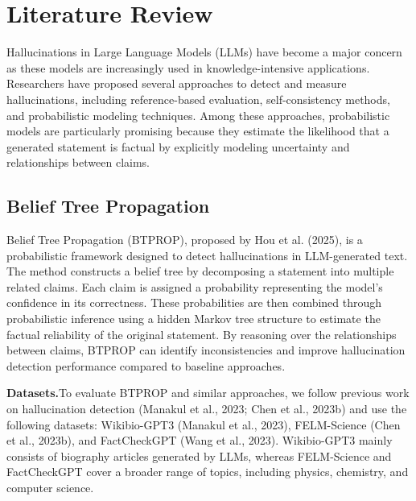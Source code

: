 \section{Literature Review}

Hallucinations in Large Language Models (LLMs) have become a major concern as these models are increasingly used in knowledge-intensive applications. Researchers have proposed several approaches to detect and measure hallucinations, including reference-based evaluation, self-consistency methods, and probabilistic modeling techniques. Among these approaches, probabilistic models are particularly promising because they estimate the likelihood that a generated statement is factual by explicitly modeling uncertainty and relationships between claims.

\subsection{Belief Tree Propagation}

Belief Tree Propagation (BTPROP), proposed by Hou et al. (2025), is a probabilistic framework designed to detect hallucinations in LLM-generated text. The method constructs a belief tree by decomposing a statement into multiple related claims. Each claim is assigned a probability representing the model’s confidence in its correctness. These probabilities are then combined through probabilistic inference using a hidden Markov tree structure to estimate the factual reliability of the original statement. By reasoning over the relationships between claims, BTPROP can identify inconsistencies and improve hallucination detection performance compared to baseline approaches.

\textbf{Datasets.}To evaluate BTPROP and similar approaches, we follow previous work on hallucination detection (Manakul et al., 2023; Chen et al., 2023b) and use the following datasets: Wikibio-GPT3 (Manakul et al., 2023), FELM-Science (Chen et al., 2023b), and FactCheckGPT (Wang et al., 2023).
Wikibio-GPT3 mainly consists of biography articles generated by LLMs, whereas FELM-Science and FactCheckGPT cover a broader range of topics, including physics, chemistry, and computer science.

\begin{table}[h]
\centering
\caption{Probabilistic Approaches for Hallucination Detection in LLMs}
\end{table}


